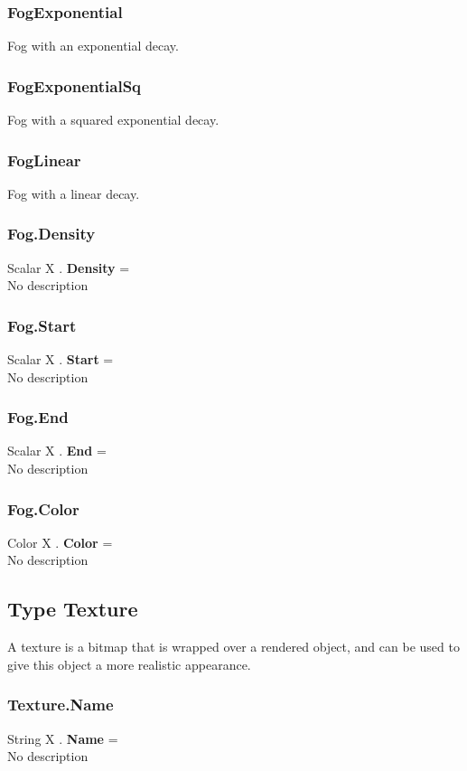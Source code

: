 \subsubsection{FogExponential \label{T:FogType|FogExponential}}
Fog with an exponential decay.

\subsubsection{FogExponentialSq \label{T:FogType|FogExponentialSq}}
Fog with a squared exponential decay.

\subsubsection{FogLinear \label{T:FogType|FogLinear}}
Fog with a linear decay.

\subsubsection{Fog.Density \label{F:Fog:Density}}
Scalar X . \textbf{Density} = \\
No description

\subsubsection{Fog.Start \label{F:Fog:Start}}
Scalar X . \textbf{Start} = \\
No description

\subsubsection{Fog.End \label{F:Fog:End}}
Scalar X . \textbf{End} = \\
No description

\subsubsection{Fog.Color \label{F:Fog:Color}}
Color X . \textbf{Color} = \\
No description

\subsection{Type Texture \label{T:Texture}}
A texture is a bitmap that is wrapped over a rendered object, and can be used to give this object a more realistic appearance.

\subsubsection{Texture.Name \label{F:Texture:Name}}
String X . \textbf{Name} = \\
No description

